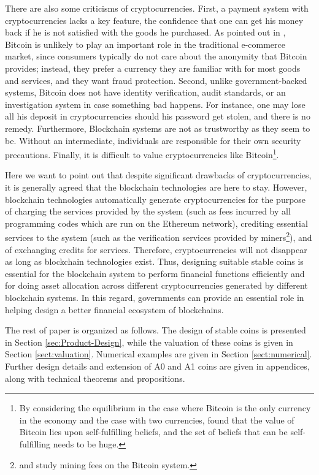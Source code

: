 \documentclass[11pt]{article}%
\numberwithin{equation}{section}
\theoremstyle{plain}
\begin{document}
There are also some criticisms of cryptocurrencies. First, a payment system with cryptocurrencies lacks a key feature, the confidence that one can get his money back if he is not satisfied with the goods he purchased. As pointed out in \cite{grinberg_bitcoin:_2011}, Bitcoin is unlikely to play an important role in the traditional e-commerce market, since consumers typically do not care about the anonymity that Bitcoin provides; instead, they prefer a currency they are familiar with for most goods and services, and they want fraud protection.  Second, unlike government-backed systems, Bitcoin does not have identity verification, audit standards, or an investigation system in case something bad happens. For instance, one may lose all his deposit in cryptocurrencies should his password get stolen, and there is no remedy. Furthermore, Blockchain systems are not as trustworthy as they seem to be. Without an intermediate, individuals are responsible for their own security precautions. Finally, it is difficult to value cryptocurrencies like Bitcoin\footnote{By considering the equilibrium in the case where Bitcoin is the only currency in the economy and the case with two currencies, \cite{garratt_bitcoin_2018} found that the value of Bitcoin lies upon self-fulfilling beliefs, and the set of beliefs that can be self-fulfilling needs to be huge.}.

Here we want to point out that despite significant drawbacks of cryptocurrencies, it is generally agreed that the blockchain technologies are here to stay. However, blockchain technologies automatically generate cryptocurrencies for the purpose of charging the services provided by the system (such as fees incurred by all programming codes which are run on the Ethereum network), crediting essential services to the system (such as the verification services provided by miners\footnote{\cite{ehb2017} and \cite{hlm2017} study mining fees on the Bitcoin system.}), and of exchanging credits for services. Therefore, cryptocurrencies will not disappear as long as blockchain technologies exist. Thus, designing suitable stable coins is essential for the blockchain system to perform financial functions efficiently and for doing asset allocation across different cryptocurrencies generated by different blockchain systems. In this regard, governments can provide an essential role in helping design a better financial ecosystem of blockchains.

The rest of paper is organized as follows. The design of stable coins is presented in Section \ref{sec:Product-Design}, while the valuation of these coins is given in Section \ref{sect:valuation}. Numerical examples are given in Section \ref{sect:numerical}. Further design details and extension of A0 and A1 coins are given in appendices, along with technical theorems and propositions.
\end{document}
